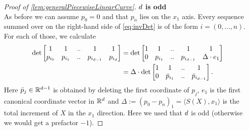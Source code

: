 \begin{proof}[Proof of \autoref{lem:generalPiecewiseLinearCurve}]
  \textbf{$d$ is odd }\\
  As before we can assume $p_0 = 0$ and that $p_n$ lies on the $x_1$ axis.
  Every sequence summed over on the right-hand side of \eqref{eq:invDet}
  is of the form $i = (0,...,n)$.
  For each of those, we calculate
  \begin{align*}
     \det\left[
       \begin{matrix}
         1       & 1       & .. & 1             & 1 \\
         p_{i_0} & p_{i_1} & .. & p_{i_{d-1}} & p_{i_d}
       \end{matrix}
     \right]
     &=
     \det\left[
       \begin{matrix}
         1 & 1       & .. & 1             & 1 \\
         0 & p_{i_1} & .. & p_{i_{d-1}} & \Delta \cdot e_1
       \end{matrix}
     \right]
     \\&=
     \Delta \cdot
     \det\left[
       \begin{matrix}
         1 & 1            & .. & 1 \\
         0 & \bar p_{i_1} & .. & \bar p_{i_{d-1}}
       \end{matrix}
     \right].
  \end{align*}
  Here $\bar p_j \in \mathbb{R}^{d-1}$ is obtained by deleting the first coordinate of $p_j$,
  $e_1$ is the first canonical coordinate vector in $\mathbb{R}^d$
  and $\Delta := (p_0 - p_n)_1 = \langle S(X), x_1 \rangle$ is the total increment of $X$ in the $x_1$ direction.
  Here we used that $d$ is odd (otherwise we would get a prefactor $-1$).


\end{proof}
